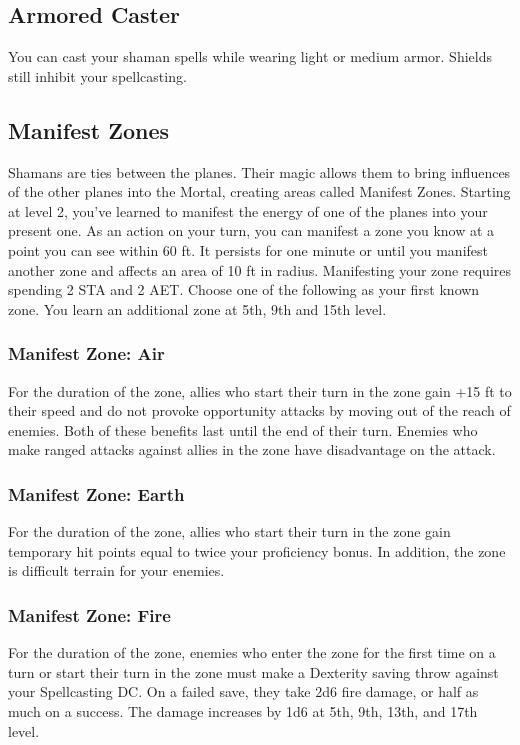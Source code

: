 \subsection{Armored Caster}

You can cast your shaman spells while wearing light or medium armor. Shields still inhibit your spellcasting.

\subsection{Manifest Zones}
Shamans are ties between the planes. Their magic allows them to bring influences of the other planes into the Mortal, creating areas called Manifest Zones. Starting at level 2, you've learned to manifest the energy of one of the planes into your present one. As an action on your turn, you can manifest a zone you know at a point you can see within 60 ft. It persists for one minute or until you manifest another zone and affects an area of 10 ft in radius. Manifesting your zone requires spending 2 STA and 2 AET. Choose one of the following as your first known zone. You learn an additional zone at 5th, 9th and 15th level.

\subsubsection{Manifest Zone: Air}
For the duration of the zone, allies who start their turn in the zone gain +15 ft to their speed and do not provoke opportunity attacks by moving out of the reach of enemies. Both of these benefits last until the end of their turn. Enemies who make ranged attacks against allies in the zone have disadvantage on the attack.
\subsubsection{Manifest Zone: Earth}
For the duration of the zone, allies who start their turn in the zone gain temporary hit points equal to twice your proficiency bonus. In addition, the zone is difficult terrain for your enemies.
\subsubsection{Manifest Zone: Fire}
For the duration of the zone, enemies who enter the zone for the first time on a turn or start their turn in the zone must make a Dexterity saving throw against your Spellcasting DC. On a failed save, they take 2d6 fire damage, or half as much on a success. The damage increases by 1d6 at 5th, 9th, 13th, and 17th level.
